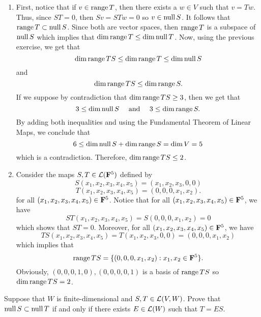 \begin{solution}
    \begin{enumerate}[label=(\alph*)]
        \item First, notice that if $v \in \operatorname{\text{range}} T$, then there exists a $w \in V$ such that $v = Tw$. Thus, since $ST = 0$, then $Sv = STw = 0$ so $v \in \operatorname{\text{null}} S$. It follows that $\operatorname{\text{range}} T \subset \operatorname{\text{null}} S$. Since both are vector spaces, then $\operatorname{\text{range}} T$ is a subspace of $\operatorname{\text{null}} S$ which implies that $\dim \operatorname{\text{range}} T \leq \dim \operatorname{\text{null}} T$. Now, using the previous exercise, we get that
        $$\dim \operatorname{\text{range}} TS \leq \dim \operatorname{\text{range}} T \leq \dim \operatorname{\text{null}} S$$
        and
        $$\dim \operatorname{\text{range}} TS \leq \dim \operatorname{\text{range}} S.$$
        If we suppose by contradiction that $\dim \operatorname{\text{range}} TS \geq 3$, then we get that
        $$3 \leq \dim \operatorname{\text{null}} S \quad \text{ and } \quad 3\leq  \dim \operatorname{\text{range}} S.$$
        By adding both inequalities and using the Fundamental Theorem of Linear Maps, we conclude that
        $$6 \leq \dim \operatorname{\text{null}} S + \dim \operatorname{\text{range}} S = \dim V = 5$$
        which is a contradiction. Therefore, $\dim \operatorname{\text{range}} TS \leq 2$.
        \item Consider the maps $S,T \in \mathcal{L}(\mathbf{F}^5)$ defined by
        $$S(x_1, x_2, x_3, x_4, x_5) = (x_1, x_2, x_3, 0, 0)$$
        $$T(x_1, x_2, x_3, x_4, x_5) = (0, 0, 0, x_1, x_2).$$
        for all $(x_1, x_2, x_3, x_4, x_5) \in \mathbf{F}^5$. Notice that for all $(x_1, x_2, x_3, x_4, x_5) \in \mathbf{F}^5$, we have
        $$ST(x_1, x_2, x_3, x_4, x_5) = S(0, 0, 0, x_1, x_2) = 0$$
        which shows that $ST = 0$. Moreover, for all $(x_1, x_2, x_3, x_4, x_5) \in \mathbf{F}^5$, we have 
        $$TS(x_1, x_2, x_3, x_4, x_5) = T(x_1, x_2, x_3, 0, 0) = (0, 0, 0, x_1, x_2)$$
        which implies that
        $$\operatorname{\text{range}} TS = \{(0, 0, 0, x_1, x_2) : x_1, x_2\in \mathbf{F}^5\}.$$
        Obviously, $(0, 0, 0, 1, 0), (0, 0, 0, 0, 1)$ is a basis of $\operatorname{\text{range}} TS$ so $\dim \operatorname{\text{range}} TS = 2$. \\
    \end{enumerate}
\end{solution}

\begin{exercise}
    Suppose that $W$ is finite-dimensional and $S,T \in \mathcal{L}(V,W)$. Prove that $\operatorname{\text{null}} S \subset \operatorname{\text{null}} T$ if and only if there exists $E \in \mathcal{L}(W)$ such that $T = ES$. \\
\end{exercise}

\begin{solution}
    \\ \td \\
\end{solution}

